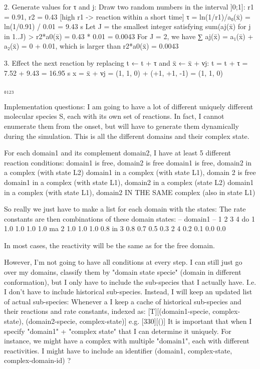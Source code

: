  2. Generate values for τ and j:
    Draw two random numbers in the interval ]0;1]:
        r1 = 0.91, r2 = 0.43                [high r1 -> reaction within a short time]
        τ = ln(1/r1)/a₀(x̄) = ln(1/0.91) / 0.01 = 9.43 s
    Let J = the smallest integer satisfying
        sum(aj(x̄) for j in 1..J) > r2*a0(x̄) = 0.43 * 0.01 = 0.0043
    For J = 2, we have
        ∑ aj(x̄) = a₁(x̄) + a₂(x̄) = 0 + 0.01, which is larger than r2*a0(x̄) = 0.0043

 3. Effect the next reaction by replacing t ← t + τ and x̄ ← x̄ + νj:
        t = t + τ = 7.52 + 9.43 = 16.95 s
        x = x̄ + νj = (1, 1, 0) + (+1, +1, -1) = (1, 1, 0)




₀₁₂₃


Implementation questions:
    I am going to have a lot of different uniquely different molecular species S,
    each with its own set of reactions. In fact, I cannot enumerate them from the onset,
    but will have to generate them dynamically during the simulation.
    This is all the different domains and their complex state.

    For each domain1 and its complement domain2, I have at least 5 different reaction conditions:
        domain1 is free, domain2 is free
        domain1 is free, domain2 in a complex (with state L2)
        domain1 in a complex (with state L1), domain 2 is free
        domain1 in a complex (with state L1), domain2 in a complex (state L2)
        domain1 in a complex (with state L1), domain2 IN THE SAME complex (also in state L1)

    So really we just have to make a list for each domain with the states:
    The rate constants are then combinations of these domain states:
                 -- domain1 --
                 1   2   3   4
         do  1  1.0 1.0 1.0 1.0
         ma  2  1.0 1.0 1.0 0.8
         in  3  0.8 0.7 0.5 0.3
         2   4  0.2 0.1 0.0 0.0

    In most cases, the reactivity will be the same as for the free domain.

    However, I'm not going to have all conditions at every step.
    I can still just go over my domains, classify them by "domain state specie" (domain in different conformation),
    but I only have to include the sub-species that I actually have. I.e.
    I don't have to include historical sub-species.
    Instead, I will keep an updated list of actual sub-species:
        Whenever a
    I keep a cache of historical sub-species and their reactions and rate constants, indexed as:
        [T][{(domain1-specie, complex-state), (domain2-specie, complex-state)}]
    e.g.
        [330][{()}]
    It is important that when I specify "domain1" + "complex state" that I can determine it uniquely.
    For instance, we might have a complex with multiple "domain1", each with different reactivities.
    I might have to include an identifier (domain1, complex-state, complex-domain-id) ?

